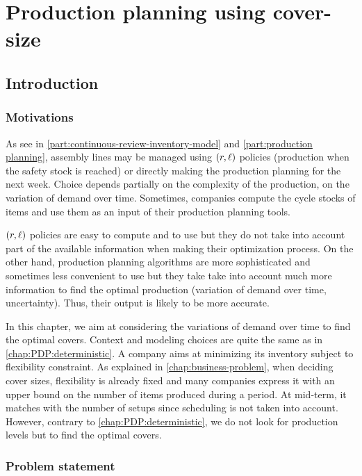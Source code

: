 \chapter{Production planning using cover-size}


\section{Introduction}


\subsection{Motivations}


As see in \cref{part:continuous-review-inventory-model} and \cref{part:production planning}, assembly lines may be managed using $\bracket{r,\ell}$ policies (\ie production when the safety stock is reached) or directly making the production planning for the next week.
Choice depends partially on the complexity of the production, on the variation of demand over time.
Sometimes, companies compute the cycle stocks of items and use them as an input of their production planning tools.


$\bracket{r,\ell}$ policies are easy to compute and to use but they do not take into account part of the available information when making their optimization process.
On the other hand, production planning algorithms are more sophisticated and sometimes less convenient to use but they take take into account much more information to find the optimal production (variation of demand over time, uncertainty).
Thus, their output is likely to be more accurate.


In this chapter, we aim at considering the variations of demand over time to find the optimal covers.
Context and modeling choices are quite the same as in \cref{chap:PDP:deterministic}.
A company aims at minimizing its inventory subject to flexibility constraint.
As explained in \cref{chap:business-problem}, when deciding cover sizes, flexibility is already fixed and many companies express it with an upper bound on the number of items produced during a period.
At mid-term, it matches with the number of setups since scheduling is not taken into account.
However, contrary to \cref{chap:PDP:deterministic}, we do not look for production levels but to find the optimal covers.



\subsection{Problem statement}



